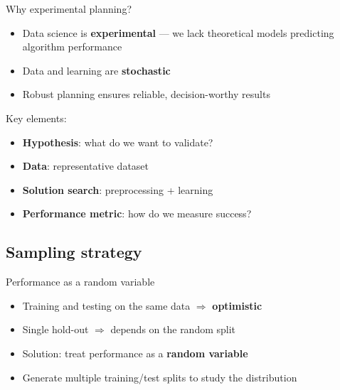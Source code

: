 \begin{frame}{Why experimental planning?}
  \begin{itemize}
    \item Data science is \textbf{experimental} --- we lack theoretical models
      predicting algorithm performance
    \item Data and learning are \textbf{stochastic}
    \item Robust planning ensures reliable, decision-worthy results
  \end{itemize}

  \vspace{0.3cm}
  Key elements:
  \begin{itemize}
    \item \textbf{Hypothesis}: what do we want to validate?
    \item \textbf{Data}: representative dataset
    \item \textbf{Solution search}: preprocessing + learning
    \item \textbf{Performance metric}: how do we measure success?
  \end{itemize}
\end{frame}

\subsection{Sampling strategy}

\begin{frame}{Performance as a random variable}
  \begin{itemize}
    \item Training and testing on the same data $\Rightarrow$ \textbf{optimistic}
    \item Single hold-out $\Rightarrow$ depends on the random split
    \item Solution: treat performance as a \textbf{random variable}
    \item Generate multiple training/test splits to study the distribution
  \end{itemize}
\end{frame}


